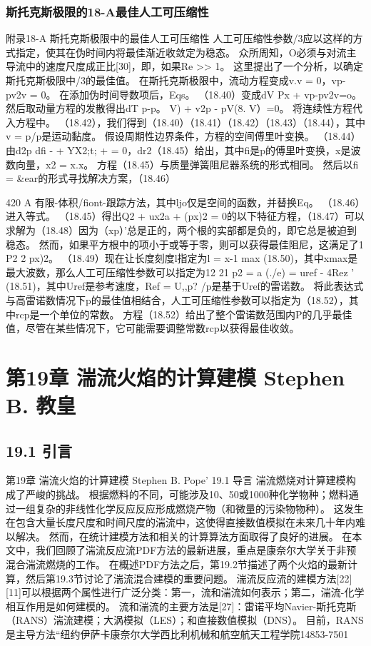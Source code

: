\documentclass[UTF8,11pt,a4paper,openany,fontset=fandol]{ctexbook}
\begin{document}
\subsection{斯托克斯极限的18-A最佳人工可压缩性}
附录18-A 斯托克斯极限中的最佳人工可压缩性 人工可压缩性参数/3应以这样的方式指定，使其在伪时间内将最佳渐近收敛定为稳态。 众所周知，O必须与对流主导流中的速度尺度成正比[30]，即，如果Re >> 1。 这里提出了一个分析，以确定斯托克斯极限中/3的最佳值。 在斯托克斯极限中，流动方程变成v.v = 0，vp-pv2v = 0。 在添加伪时间导数项后，Eqs。 （18.40）变成dV Px + vp-pv2v=o。 然后取动量方程的发散得出dT p-p。 V) + v2p - pV(8. V）=0。 将连续性方程代入方程中。 （18.42），我们得到（18.40）（18.41）（18.42）（18.43）（18.44），其中v = p/p是运动黏度。 假设周期性边界条件，方程的空间傅里叶变换。 （18.44）由d2p dfi - + YX2;t; + = 0，dr2（18.45）给出，其中fi是p的傅里叶变换，x是波数向量，x2 = x.x。 方程（18.45）与质量弹簧阻尼器系统的形式相同。 然后以fi = \&ear的形式寻找解决方案，（18.46）

420 A 有限-体积/fiont-跟踪方法，其中ljo仅是空间的函数，并替换Eq。 （18.46）进入等式。 （18.45）得出Q2 + ux2a + (px)2 = 0的以下特征方程，（18.47）可以求解为（18.48）因为（xp）'总是正的，两个根的实部都是负的，即它总是被迫到稳态。 然而，如果平方根中的项小于或等于零，则可以获得最佳阻尼，这满足了1 P2 2 px)2。 （18.49）现在让长度刻度l指定为l = x-1 max (18.50)，其中xmax是最大波数，那么人工可压缩性参数可以指定为12 21 p2 = a (./e) = uref - 4Rez ' (18.51)，其中Uref是参考速度，Ref = U,,p? /p是基于Uref的雷诺数。 将此表达式与高雷诺数情况下p的最佳值相结合，人工可压缩性参数可以指定为（18.52），其中rcp是一个单位的常数。 方程（18.52）给出了整个雷诺数范围内P的几乎最佳值，尽管在某些情况下，它可能需要调整常数rcp以获得最佳收敛。

\clearpage
\chapter{第19章 湍流火焰的计算建模 Stephen B. 教皇}
\section{19.1 引言}
第19章 湍流火焰的计算建模 Stephen B. Pope' 19.1 导言 湍流燃烧对计算建模构成了严峻的挑战。 根据燃料的不同，可能涉及10、50或1000种化学物种；燃料通过一组复杂的非线性化学反应反应形成燃烧产物（和微量的污染物物种）。 这发生在包含大量长度尺度和时间尺度的湍流中，这使得直接数值模拟在未来几十年内难以解决。 然而，在统计建模方法和相关的计算算法方面取得了良好的进展。 在本文中，我们回顾了湍流反应流PDF方法的最新进展，重点是康奈尔大学关于非预混合湍流燃烧的工作。 在概述PDF方法之后，第19.2节描述了两个火焰的最新计算，然后第19.3节讨论了湍流混合建模的重要问题。 湍流反应流的建模方法[22][11]可以根据两个属性进行广泛分类：第一，流和湍流如何表示；第二，湍流-化学相互作用是如何建模的。 流和湍流的主要方法是[27]：雷诺平均Navier-斯托克斯（RANS）湍流建模；大涡模拟（LES）；和直接数值模拟（DNS）。 目前，RANS是主导方法“纽约伊萨卡康奈尔大学西比利机械和航空航天工程学院14853-7501
\end{document}
